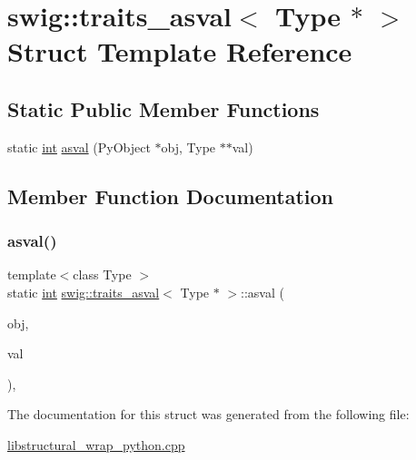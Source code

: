 \hypertarget{structswig_1_1traits__asval_3_01_type_01_5_01_4}{}\section{swig\+:\+:traits\+\_\+asval$<$ Type $\ast$ $>$ Struct Template Reference}
\label{structswig_1_1traits__asval_3_01_type_01_5_01_4}
\subsection*{Static Public Member Functions}
\begin{DoxyCompactItemize}
\item 
static \hyperlink{lp__lib_8h_adeb9ec6400320e4923ac9d836d509ddb}{int} \hyperlink{structswig_1_1traits__asval_3_01_type_01_5_01_4_a32b6c9822265d2822408db76cbae92c4}{asval} (Py\+Object $\ast$obj, Type $\ast$$\ast$val)
\end{DoxyCompactItemize}


\subsection{Member Function Documentation}
\mbox{\label{structswig_1_1traits__asval_3_01_type_01_5_01_4_a32b6c9822265d2822408db76cbae92c4}} 
\subsubsection{\texorpdfstring{asval()}{asval()}}
{\footnotesize\ttfamily template$<$class Type $>$ \\
static \hyperlink{lp__lib_8h_adeb9ec6400320e4923ac9d836d509ddb}{int} \hyperlink{structswig_1_1traits__asval}{swig\+::traits\+\_\+asval}$<$ Type $\ast$ $>$\+::asval (\begin{DoxyParamCaption}\item[{Py\+Object $\ast$}]{obj,  }\item[{Type $\ast$$\ast$}]{val }\end{DoxyParamCaption})\hspace{0.3cm}{\ttfamily [inline]}, {\ttfamily [static]}}



The documentation for this struct was generated from the following file\+:\begin{DoxyCompactItemize}
\item 
\hyperlink{libstructural__wrap__python_8cpp}{libstructural\+\_\+wrap\+\_\+python.\+cpp}\end{DoxyCompactItemize}
